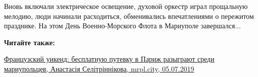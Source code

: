 Вновь включали электрическое освещение, духовой оркестр играл прощальную
мелодию, люди начинали расходиться, обменивались впечатлениями о пережитом
празднике. На этом День Военно-Морского Флота в Мариуполе завершался...

\textbf{Читайте также:} 

\href{https://mrpl.city/news/view/frantsuzskij-uikend-besplatnuyu-putevku-v-parizh-razygrayut-sredi-mariupoltsev}{%
Французский уикенд: бесплатную путевку в Париж разыграют среди мариупольцев, Анастасія Селітріннікова, mrpl.city, 05.07.2019}

